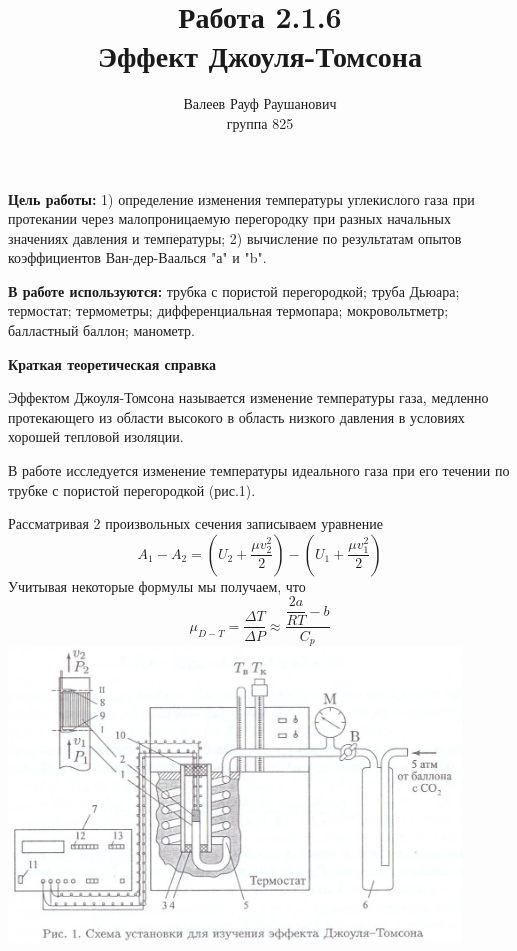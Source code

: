 \documentclass[a4paper, 12pt]{article}%
\author{Валеев Рауф Раушанович \\
группа 825}
\title{\textbf{Работа 2.1.6 \\ 
Эффект Джоуля-Томсона}}
\begin{document}
\maketitle

\newpage
	\textbf{Цель работы:} 1) определение изменения температуры углекислого газа при протекании через малопроницаемую перегородку при разных начальных значениях давления и температуры; 2) вычисление по результатам опытов коэффициентов Ван-дер-Ваалься "а" и "b".

	\textbf{В работе используются:} трубка с пористой перегородкой; труба Дьюара; термостат; термометры; дифференциальная термопара; мокровольтметр; балластный баллон; манометр.

\textbf{Краткая теоретическая справка}

	Эффектом Джоуля-Томсона называется изменение температуры газа, медленно протекающего из области высокого в область низкого давления в условиях хорошей тепловой изоляции.
	
	В работе исследуется изменение температуры идеального газа при его течении по трубке с пористой перегородкой (рис.1). 
	
	Рассматривая 2 произвольных сечения записываем уравнение 
	\[A_1 - A_2 = \left( U_2 + \dfrac{\mu v_2^2}{2} \right) - \left( U_1 + \dfrac{\mu v_1^2}{2} \right) \]
	Учитывая некоторые формулы мы получаем, что 
	\[\mu_{D-T} = \dfrac{\Delta T}{\Delta P} \approx \dfrac{\dfrac{2a}{RT} - b}{C_p} \]
	\includegraphics[width = 0.9\textwidth]{216_1.jpg}
	
	\newpage
	
\end{document}
